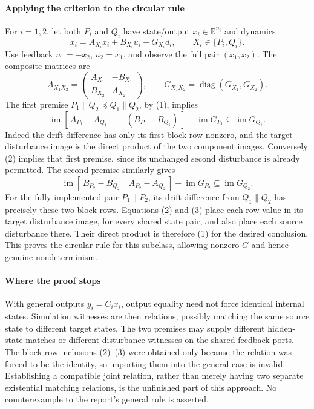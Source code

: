 \documentclass[11pt]{article}
\begin{document}
\paragraph{Applying the criterion to the circular rule}
For $i=1,2$, let both $P_i$ and $Q_i$ have state/output $x_i\in\mathbb R^{n_i}$ and dynamics
\[
 \dot x_i=A_{X_i}x_i+B_{X_i}u_i+G_{X_i}d_i,
 \qquad X_i\in\{P_i,Q_i\}.
\]
Use feedback $u_1=-x_2$, $u_2=x_1$, and observe the full pair $(x_1,x_2)$. The composite matrices are
\[
 A_{X_1X_2}=\begin{pmatrix}A_{X_1}&-B_{X_1}\\ B_{X_2}&A_{X_2}\end{pmatrix},\qquad
 G_{X_1X_2}=\operatorname{diag}(G_{X_1},G_{X_2}).
\]
The first premise $P_1\parallel Q_2\preccurlyeq Q_1\parallel Q_2$, by (1), implies
\[
 \operatorname{im}[\,A_{P_1}-A_{Q_1}\quad -(B_{P_1}-B_{Q_1})\,]
       +\operatorname{im}G_{P_1}\subseteq\operatorname{im}G_{Q_1}.
 \tag{2}
\]
Indeed the drift difference has only its first block row nonzero, and the target disturbance image is the direct product of the two component images. Conversely (2) implies that first premise, since its unchanged second disturbance is already permitted. The second premise similarly gives
\[
 \operatorname{im}[\,B_{P_2}-B_{Q_2}\quad A_{P_2}-A_{Q_2}\,]
       +\operatorname{im}G_{P_2}\subseteq\operatorname{im}G_{Q_2}.
 \tag{3}
\]
For the fully implemented pair $P_1\parallel P_2$, its drift difference from $Q_1\parallel Q_2$ has precisely these two block rows. Equations (2) and (3) place each row value in its target disturbance image, for every shared state pair, and also place each source disturbance there. Their direct product is therefore (1) for the desired conclusion. This proves the circular rule for this subclass, allowing nonzero $G$ and hence genuine nondeterminism.

\paragraph{Where the proof stops}
With general outputs $y_i=C_ix_i$, output equality need not force identical internal states. Simulation witnesses are then relations, possibly matching the same source state to different target states. The two premises may supply different hidden-state matches or different disturbance witnesses on the shared feedback ports. The block-row inclusions (2)--(3) were obtained only because the relation was forced to be the identity, so importing them into the general case is invalid. Establishing a compatible joint relation, rather than merely having two separate existential matching relations, is the unfinished part of this approach. No counterexample to the report's general rule is asserted.
\end{document}
